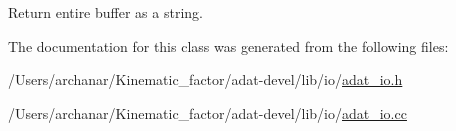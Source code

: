 Return entire buffer as a string. 



The documentation for this class was generated from the following files\+:\begin{DoxyCompactItemize}
\item 
/\+Users/archanar/\+Kinematic\+\_\+factor/adat-\/devel/lib/io/\mbox{\hyperlink{adat-devel_2lib_2io_2adat__io_8h}{adat\+\_\+io.\+h}}\item 
/\+Users/archanar/\+Kinematic\+\_\+factor/adat-\/devel/lib/io/\mbox{\hyperlink{adat-devel_2lib_2io_2adat__io_8cc}{adat\+\_\+io.\+cc}}\end{DoxyCompactItemize}
